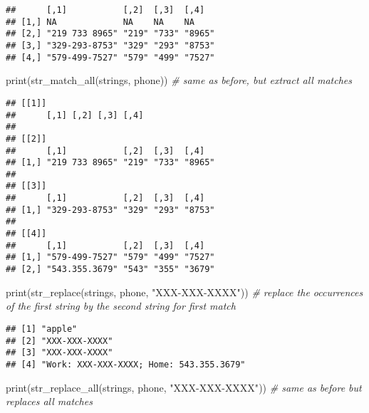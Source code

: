 \documentclass[
]{article}
\newenvironment{Shaded}{\begin{snugshade}}{\end{snugshade}}
\newcommand{\CommentTok}[1]{\textcolor[rgb]{0.56,0.35,0.01}{\textit{#1}}}
\newcommand{\FunctionTok}[1]{\textcolor[rgb]{0.00,0.00,0.00}{#1}}
\newcommand{\NormalTok}[1]{#1}
\newcommand{\StringTok}[1]{\textcolor[rgb]{0.31,0.60,0.02}{#1}}
\begin{document}
\begin{verbatim}
##      [,1]           [,2]  [,3]  [,4]  
## [1,] NA             NA    NA    NA    
## [2,] "219 733 8965" "219" "733" "8965"
## [3,] "329-293-8753" "329" "293" "8753"
## [4,] "579-499-7527" "579" "499" "7527"
\end{verbatim}

\begin{Shaded}
\begin{Highlighting}[]
\FunctionTok{print}\NormalTok{(}\FunctionTok{str\_match\_all}\NormalTok{(strings, phone)) }\CommentTok{\# same as before, but extract all matches}
\end{Highlighting}
\end{Shaded}

\begin{verbatim}
## [[1]]
##      [,1] [,2] [,3] [,4]
## 
## [[2]]
##      [,1]           [,2]  [,3]  [,4]  
## [1,] "219 733 8965" "219" "733" "8965"
## 
## [[3]]
##      [,1]           [,2]  [,3]  [,4]  
## [1,] "329-293-8753" "329" "293" "8753"
## 
## [[4]]
##      [,1]           [,2]  [,3]  [,4]  
## [1,] "579-499-7527" "579" "499" "7527"
## [2,] "543.355.3679" "543" "355" "3679"
\end{verbatim}

\begin{Shaded}
\begin{Highlighting}[]
\FunctionTok{print}\NormalTok{(}\FunctionTok{str\_replace}\NormalTok{(strings, phone, }\StringTok{"XXX{-}XXX{-}XXXX"}\NormalTok{)) }\CommentTok{\# replace the occurrences of the first string by the second string for first match}
\end{Highlighting}
\end{Shaded}

\begin{verbatim}
## [1] "apple"                                 
## [2] "XXX-XXX-XXXX"                          
## [3] "XXX-XXX-XXXX"                          
## [4] "Work: XXX-XXX-XXXX; Home: 543.355.3679"
\end{verbatim}

\begin{Shaded}
\begin{Highlighting}[]
\FunctionTok{print}\NormalTok{(}\FunctionTok{str\_replace\_all}\NormalTok{(strings, phone, }\StringTok{"XXX{-}XXX{-}XXXX"}\NormalTok{)) }\CommentTok{\# same as before but replaces all matches}
\end{Highlighting}
\end{Shaded}
\end{document}
